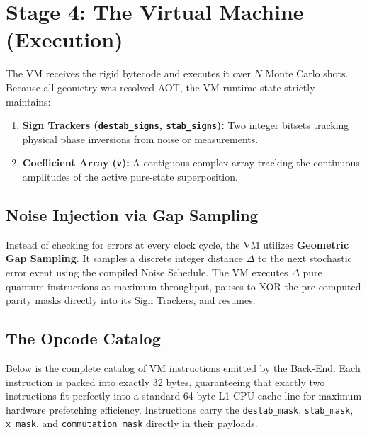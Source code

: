 \documentclass[11pt]{article}
\begin{document}
\section{Stage 4: The Virtual Machine (Execution)}

The VM receives the rigid bytecode and executes it over $N$ Monte Carlo shots. Because all geometry was resolved AOT, the VM runtime state strictly maintains:
\begin{enumerate}
    \item \textbf{Sign Trackers (\texttt{destab\_signs}, \texttt{stab\_signs}):} Two integer bitsets tracking physical phase inversions from noise or measurements.
    \item \textbf{Coefficient Array (\texttt{v}):} A contiguous complex array tracking the continuous amplitudes of the active pure-state superposition.
\end{enumerate}

\subsection{Noise Injection via Gap Sampling}
Instead of checking for errors at every clock cycle, the VM utilizes \textbf{Geometric Gap Sampling}. It samples a discrete integer distance $\Delta$ to the next stochastic error event using the compiled Noise Schedule. The VM executes $\Delta$ pure quantum instructions at maximum throughput, pauses to XOR the pre-computed parity masks directly into its Sign Trackers, and resumes.

\subsection{The Opcode Catalog}
Below is the complete catalog of VM instructions emitted by the Back-End. Each instruction is packed into exactly 32 bytes, guaranteeing that exactly two instructions fit perfectly into a standard 64-byte L1 CPU cache line for maximum hardware prefetching efficiency. Instructions carry the \texttt{destab\_mask}, \texttt{stab\_mask}, \texttt{x\_mask}, and \texttt{commutation\_mask} directly in their payloads.
\end{document}
